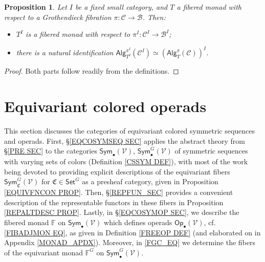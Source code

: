 \documentclass[a4paper,10pt
,draft
]{article}%
\numberwithin{equation}{section}
\numberwithin{figure}{section}
\newtheorem{proposition}[equation]{Proposition}%
\theoremstyle{definition} %
\newcommand{\Sym}{\ensuremath{\mathsf{Sym}}}%
\newcommand{\V}{\ensuremath{\mathcal V}}
\newcommand{\1}{\ensuremath{\mathbbm 1}}%
\begin{document}
\begin{proposition}\label{DIAGRAMFM_PROP}
	Let $I$ be a fixed small category, and $T$ a fibered monad with respect to a Grothendieck fibration 
	$\pi \colon \mathcal{C} \to \mathcal{B}$. Then:
	\begin{itemize}
		\item[(i)] $T^I$ is a fibered monad with respect to $\pi^I\colon \mathcal{C}^I \to \mathcal{B}^I$;
		\item[(ii)] there is a natural identification 
		$\mathsf{Alg}_{T^I}^{\pi^I}(\mathcal{C}^I)
		\simeq
		\left(\mathsf{Alg}_T^{\pi}(\mathcal{C})\right)^I$.
	\end{itemize}
\end{proposition}

\begin{proof}
	Both parts follow readily from the definitions.
\end{proof}





\section{Equivariant colored operads}
\label{ECO_SEC}

This section discusses the categories of equivariant colored symmetric sequences and operads.
First, \S \ref{EQCOSYMSEQ SEC} applies the abstract theory from \S \ref{PRE SEC}
to the categories
$\mathsf{Sym}_{\bullet}(\V)$,
$\mathsf{Sym}^G_{\bullet}(\V)$
of symmetric sequences with varying sets of colors 
(Definition \ref{CSSYM DEF}), 
with most of the work being devoted to providing 
explicit descriptions of the equivariant fibers
$\mathsf{Sym}^G_{\mathfrak{C}}(\V)$
for $\mathfrak{C} \in \mathsf{Set}^G$
as a presheaf category,
given in Proposition \ref{EQUIVFNCON PROP}. 
Then, \S \ref{REPFUN_SEC} provides a convenient description of the representable functors in these fibers in Proposition \ref{REPALTDESC PROP}.
%
Lastly, in \S \ref{EQCOSYMOP SEC}, 
we describe the fibered monad $\mathbb F$ on $\Sym_\bullet(\V)$
which defines operads $\mathsf{Op}_\bullet(\V)$,
cf. \eqref{FIBADJMON EQ},
as given in Definition \ref{FREEOP DEF}
(and elaborated on in Appendix \ref{MONAD_APDX}). Moreover, 
in \eqref{FGC_EQ}
we determine the fibers of the equivariant monad $\mathbb F^G$ on $\Sym_\bullet^G(\V)$.
\end{document}
